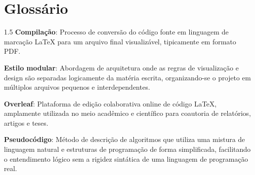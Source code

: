 
\chapter*{Glossário}

\begin{spacing}{1.5}
  \noindent
  \textbf{Compilação}: Processo de conversão do código fonte em linguagem de marcação LaTeX para um arquivo final visualizável, tipicamente em formato PDF.
  
  \vspace{0.5em}
  \noindent
  \textbf{Estilo modular}: Abordagem de arquitetura onde as regras de visualização e design são separadas logicamente da matéria escrita, organizando-se o projeto em múltiplos arquivos pequenos e interdependentes.
  
  \vspace{0.5em}
  \noindent
  \textbf{Overleaf}: Plataforma de edição colaborativa online de código LaTeX, amplamente utilizada no meio acadêmico e científico para coautoria de relatórios, artigos e teses.
  
  \vspace{0.5em}
  \noindent
  \textbf{Pseudocódigo}: Método de descrição de algoritmos que utiliza uma mistura de linguagem natural e estruturas de programação de forma simplificada, facilitando o entendimento lógico sem a rigidez sintática de uma linguagem de programação real.
\end{spacing}
